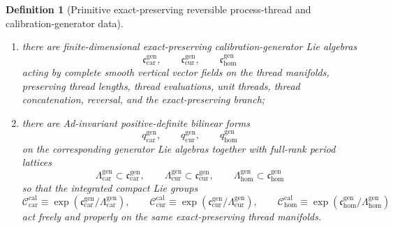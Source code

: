 \documentclass[11pt]{article}
\newcommand{\TensorCalGroup}{\mathcal C_{\mathrm{car}}^{\mathrm{cal}}}
\newcommand{\CurCalGroup}{\mathcal C_{\mathrm{cur}}^{\mathrm{cal}}}
\newcommand{\HomCalGroup}{\mathcal C_{\mathrm{hom}}^{\mathrm{cal}}}
\newcommand{\TensorCalLie}{\mathfrak c_{\mathrm{car}}^{\mathrm{gen}}}
\newcommand{\CurCalLie}{\mathfrak c_{\mathrm{cur}}^{\mathrm{gen}}}
\newcommand{\HomCalLie}{\mathfrak c_{\mathrm{hom}}^{\mathrm{gen}}}
\newcommand{\TensorCalMetric}{q_{\mathrm{car}}^{\mathrm{gen}}}
\newcommand{\CurCalMetric}{q_{\mathrm{cur}}^{\mathrm{gen}}}
\newcommand{\HomCalMetric}{q_{\mathrm{hom}}^{\mathrm{gen}}}
\newcommand{\TensorCalLat}{\Lambda_{\mathrm{car}}^{\mathrm{gen}}}
\newcommand{\CurCalLat}{\Lambda_{\mathrm{cur}}^{\mathrm{gen}}}
\newcommand{\HomCalLat}{\Lambda_{\mathrm{hom}}^{\mathrm{gen}}}
\newtheorem{definition}{Definition}
\begin{document}
\begin{definition}[Primitive exact-preserving reversible process-thread and calibration-generator data]
\begin{enumerate}
\[    \]
    for all admissible \(0\le a\le b\), which are identity on degenerate intervals, multiplicative under interval concatenation, inverse under thread reversal, and exact-preserving on the fixed branch;
    \item there are finite-dimensional exact-preserving calibration-generator Lie algebras
    \[
    \TensorCalLie,\qquad
    \CurCalLie,\qquad
    \HomCalLie
    \]
    acting by complete smooth vertical vector fields on the thread manifolds, preserving thread lengths, thread evaluations, unit threads, thread concatenation, reversal, and the exact-preserving branch;
    \item there are Ad-invariant positive-definite bilinear forms
    \[
    \TensorCalMetric,\qquad
    \CurCalMetric,\qquad
    \HomCalMetric
    \]
    on the corresponding generator Lie algebras together with full-rank period lattices
    \[
    \TensorCalLat\subset\TensorCalLie,\qquad
    \CurCalLat\subset\CurCalLie,\qquad
    \HomCalLat\subset\HomCalLie
    \]
    so that the integrated compact Lie groups
    \[
    \TensorCalGroup\equiv\exp(\TensorCalLie/\TensorCalLat),\qquad
    \CurCalGroup\equiv\exp(\CurCalLie/\CurCalLat),\qquad
    \HomCalGroup\equiv\exp(\HomCalLie/\HomCalLat)
    \]
    act freely and properly on the same exact-preserving thread manifolds.
\end{enumerate}


\end{definition}
\end{document}
